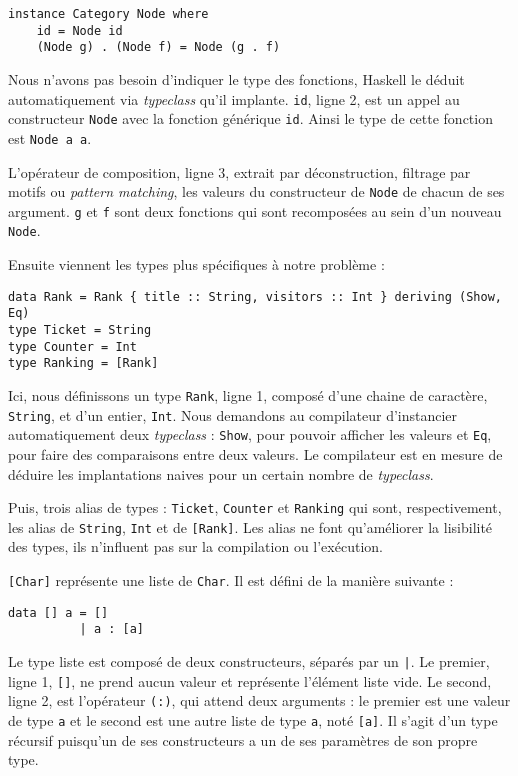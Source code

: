 \documentclass{llncs}
\begin{document}
\begin{lstlisting}
instance Category Node where
    id = Node id
    (Node g) . (Node f) = Node (g . f)
\end{lstlisting}

Nous n'avons pas besoin d'indiquer le type des fonctions, Haskell le déduit automatiquement
via \emph{typeclass} qu'il implante.
\lstinline{id}, ligne 2, est un appel au constructeur \lstinline{Node} avec la
fonction générique \lstinline{id}.
Ainsi le type de cette fonction est \lstinline{Node a a}.

L'opérateur de composition, ligne 3, extrait par déconstruction, filtrage par motifs
ou \emph{pattern matching}, les valeurs du constructeur de \lstinline{Node} de chacun de ses argument.
\lstinline{g} et \lstinline{f} sont deux fonctions qui sont recomposées au sein
d'un nouveau \lstinline{Node}.

Ensuite viennent les types plus spécifiques à notre problème :

\begin{lstlisting}
data Rank = Rank { title :: String, visitors :: Int } deriving (Show, Eq)
type Ticket = String
type Counter = Int
type Ranking = [Rank]
\end{lstlisting}

Ici, nous définissons un type \lstinline{Rank}, ligne 1,
composé d'une chaine de caractère, \lstinline{String}, et d'un entier, \lstinline{Int}.
Nous demandons au compilateur d'instancier automatiquement deux \emph{typeclass} :
\lstinline{Show}, pour pouvoir afficher les valeurs et \lstinline{Eq},
pour faire des comparaisons entre deux valeurs.
Le compilateur est en mesure de déduire les implantations naives pour un certain
nombre de \emph{typeclass}.

Puis, trois alias de types : \lstinline{Ticket}, \lstinline{Counter} et
\lstinline{Ranking} qui sont, respectivement, les alias de \lstinline{String},
\lstinline{Int} et de \lstinline{[Rank]}.
Les alias ne font qu'améliorer la lisibilité des types, ils n'influent pas sur
la compilation ou l'exécution.

\lstinline{[Char]} représente une liste de \lstinline{Char}.
Il est défini de la manière suivante :
\begin{lstlisting}
data [] a = []
          | a : [a]
\end{lstlisting}

Le type liste est composé de deux constructeurs, séparés par un \lstinline{|}.
Le premier, ligne 1, \lstinline{[]}, ne prend aucun valeur et représente l'élément
liste vide.
Le second, ligne 2, est l'opérateur \lstinline{(:)}, qui attend deux arguments :
le premier est une valeur de type \lstinline{a} et le second est une autre liste de
type \lstinline{a}, noté \lstinline{[a]}.
Il s'agit d'un type récursif puisqu'un de ses constructeurs a un de ses paramètres
de son propre type.
\end{document}
